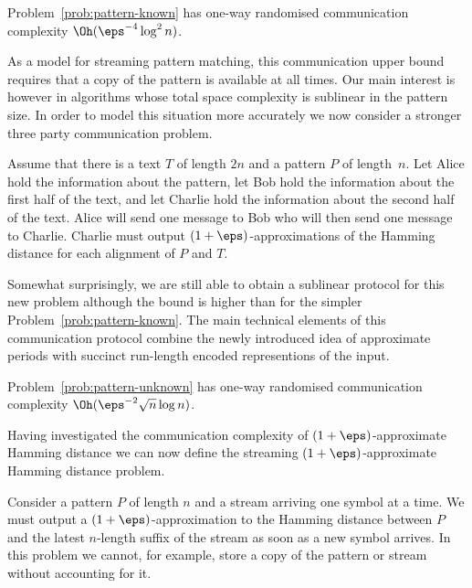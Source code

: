 \begin{theorem}\label{th:pattern-known}
Problem~\ref{prob:pattern-known} has one-way randomised communication complexity $\Oh (\eps^{-4}\log^2 n)$.
\end{theorem}

As a model for streaming pattern matching, this communication upper bound requires that a copy of the pattern is available at all times.  Our main interest is however in algorithms whose total space complexity is sublinear in the pattern size. In order to model this situation more accurately we now consider a stronger three party communication problem.  

\begin{problem}\label{prob:pattern-unknown}
Assume that there is a text $T$ of length $2n$ and a pattern $P$ of length~$n$. Let Alice hold the information about the pattern, let Bob hold the information about the first half of the text, and let Charlie hold the information about the second half of the text. Alice will send one message to Bob who will then send one message to Charlie. Charlie must output $(1+\eps)$-approximations of the Hamming distance for each alignment of $P$ and $T$.
\end{problem}

Somewhat surprisingly, we are still able to obtain a sublinear protocol for this new problem although the bound is higher than for the simpler Problem~\ref{prob:pattern-known}.  The main technical elements of this communication protocol combine the newly introduced idea of approximate periods with succinct run-length encoded representions of the input.



\begin{theorem}\label{th:pattern-unknown}
Problem~\ref{prob:pattern-unknown} has one-way randomised communication complexity $\Oh (\eps^{-2}\sqrt{n} \log n)$.
\end{theorem}

Having investigated the communication complexity of $(1+\eps)$-approximate Hamming distance we can now define the streaming $(1+\eps)$-approximate Hamming distance problem.

\begin{problem}\label{prob:streaming}
Consider a pattern $P$ of length $n$ and a stream arriving one symbol at a time. We must output a $(1+\eps)$-approximation to the Hamming distance between $P$ and the latest $n$-length suffix of the stream as soon as a new symbol arrives. In this problem we cannot, for example, store a copy of the pattern or stream without accounting for it.
\end{problem}

